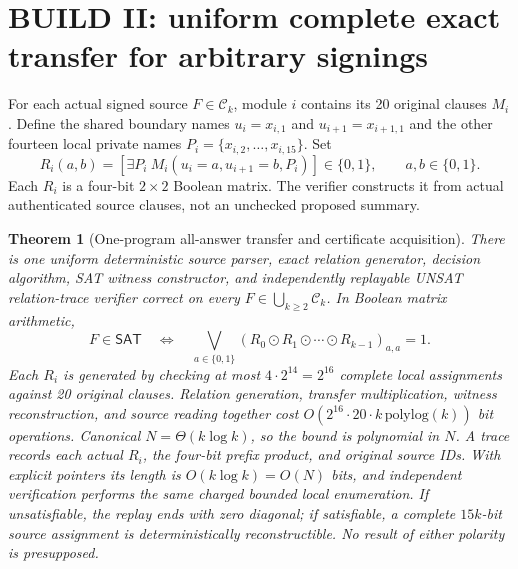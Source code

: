 \documentclass[11pt]{article}
\newtheorem{theorem}{Theorem}
\newcommand{\SAT}{\mathsf{SAT}}
\begin{document}
\section{BUILD II: uniform complete exact transfer for arbitrary signings}
For each actual signed source $F\in\mathcal C_k$, module $i$ contains its 20 original clauses $M_i$. Define the shared boundary names $u_i=x_{i,1}$ and $u_{i+1}=x_{i+1,1}$ and the other fourteen local private names $P_i=\{x_{i,2},\ldots,x_{i,15}\}$. Set
\[
 R_i(a,b)=[\exists P_i\ M_i(u_i=a,u_{i+1}=b,P_i)]\in\{0,1\},\qquad a,b\in\{0,1\}.
\]
Each $R_i$ is a four-bit $2\times2$ Boolean matrix. The verifier constructs it from actual authenticated source clauses, not an unchecked proposed summary.

\begin{theorem}[One-program all-answer transfer and certificate acquisition]\label{thm:transfer}
There is one uniform deterministic source parser, exact relation generator, decision algorithm, SAT witness constructor, and independently replayable UNSAT relation-trace verifier correct on every $F\in\bigcup_{k\ge2}\mathcal C_k$. In Boolean matrix arithmetic,
\[
 F\in\SAT\quad\Longleftrightarrow\quad
 \bigvee_{a\in\{0,1\}}
 (R_0\odot R_1\odot\cdots\odot R_{k-1})_{a,a}=1.
\]
Each $R_i$ is generated by checking at most $4\cdot2^{14}=2^{16}$ complete local assignments against 20 original clauses. Relation generation, transfer multiplication, witness reconstruction, and source reading together cost $O(2^{16}\cdot20\cdot k\,\mathrm{polylog}(k))$ bit operations. Canonical $N=\Theta(k\log k)$, so the bound is polynomial in $N$. A trace records each actual $R_i$, the four-bit prefix product, and original source IDs. With explicit pointers its length is $O(k\log k)=O(N)$ bits, and independent verification performs the same charged bounded local enumeration. If unsatisfiable, the replay ends with zero diagonal; if satisfiable, a complete $15k$-bit source assignment is deterministically reconstructible. No result of either polarity is presupposed.
\end{theorem}
\end{document}
